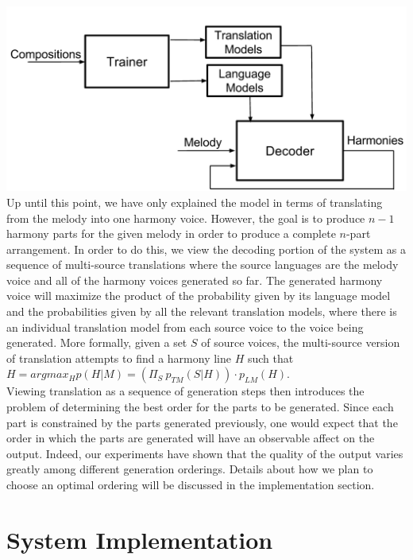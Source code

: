 \documentclass{sig-alternate}
\begin{document}
\includegraphics[scale=0.2]{design_overview.png}\\

Up until this point, we have only explained the model in terms of translating from the melody into one harmony voice. However, the goal is to produce $n - 1$ harmony parts for the given melody in order to produce a complete $n$-part arrangement. In order to do this, we view the decoding portion of the system as a sequence of multi-source translations where the source languages are the melody voice and all of the harmony voices generated so far. The generated harmony voice will maximize the product of the probability given by its language model and the probabilities given by all the relevant translation models, where there is an individual translation model from each source voice to the voice being generated. More formally, given a set $S$ of source voices, the multi-source version of translation attempts to find a harmony line $H$ such that\\

$H = argmax_{H}p(H | M) = (\Pi_{S}\ p_{TM}(S | H)) \cdot p_{LM}(H)$.\\

Viewing translation as a sequence of generation steps then introduces the problem of determining the best order for the parts to be generated. Since each part is constrained by the parts generated previously, one would expect that the order in which the parts are generated will have an observable affect on the output. Indeed, our experiments have shown that the quality of the output varies greatly among different generation orderings. Details about how we plan to choose an optimal ordering will be discussed in the implementation section.

\section{System Implementation}
\label{sec:sys_implement}
\end{document}
